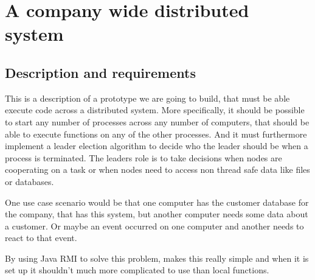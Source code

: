 \chapter{A company wide distributed system}

\section{Description and requirements}
This is a description of a prototype we are going to build, that must be able execute code across a distributed system. More specifically, it should be possible to start any number of processes across any number of computers, that should be able to execute functions on any of the other processes. And it must furthermore implement a leader election algorithm to decide who the leader should be when a process is terminated. The leaders role is to take decisions when nodes are cooperating on a task or when nodes need to access non thread safe data like files or databases.

One use case scenario would be that one computer has the customer database for the company, that has this system, but another computer needs some data about a customer. Or maybe an event occurred on one computer and another needs to react to that event. 

By using Java RMI to solve this problem, makes this really simple and when it is set up it shouldn't much more complicated to use than local functions.
